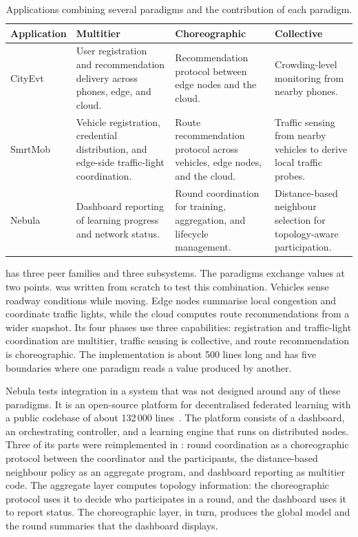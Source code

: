 \begin{table}[t]
    \centering
    \caption{Applications combining several paradigms and the contribution of each paradigm.}
    \label{tab:camil-integration}
    \scriptsize
    \setlength{\tabcolsep}{4pt}
    \begin{tabularx}{\textwidth}{@{}l>{\raggedright\arraybackslash}X>{\raggedright\arraybackslash}X>{\raggedright\arraybackslash}X@{}}
        \toprule
        \textbf{Application} & \textbf{Multitier} & \textbf{Choreographic} & \textbf{Collective} \\
        \midrule
        CityEvt & User registration and recommendation delivery across phones, edge, and cloud. & Recommendation protocol between edge nodes and the cloud. & Crowding-level monitoring from nearby phones. \\
        \addlinespace
        SmrtMob & Vehicle registration, credential distribution, and edge-side traffic-light coordination. & Route recommendation protocol across vehicles, edge nodes, and the cloud. & Traffic sensing from nearby vehicles to derive local traffic probes. \\
        \addlinespace
        Nebula & Dashboard reporting of learning progress and network status. & Round coordination for training, aggregation, and lifecycle management. & Distance-based neighbour selection for topology-aware participation. \\
        \bottomrule
    \end{tabularx}
\end{table}

\cityevt has three peer families and three subsystems.
The paradigms exchange values at two points.
%
\smrtmob was written from scratch to test this combination.
Vehicles sense roadway conditions while moving.
Edge nodes summarise local congestion and coordinate traffic lights,
while the cloud computes route recommendations from a wider snapshot.
%
Its four phases use three capabilities:
registration and traffic-light coordination are multitier,
traffic sensing is collective,
and route recommendation is choreographic.
%
The implementation is about 500 lines long and has five boundaries where one paradigm reads a value produced by another.

Nebula tests integration in a system that was not designed around any of these paradigms.
%
It is an open-source platform for decentralised federated learning with a public codebase of about 132\,000 lines~\cite{beltran2023decentralized,MartinezBeltran:fedstellar:2024,Nebula}.
The platform consists of a dashboard, an orchestrating controller, and a learning engine that runs on distributed nodes.
%
Three of its parts were reimplemented in \camil:
round coordination as a choreographic protocol between the coordinator and the participants,
the distance-based neighbour policy as an aggregate program,
and dashboard reporting as multitier code.
%
The aggregate layer computes topology information:
the choreographic protocol uses it to decide who participates in a round, and the dashboard uses it to report status.
%
The choreographic layer, in turn, produces the global model and the round summaries that the dashboard displays.

